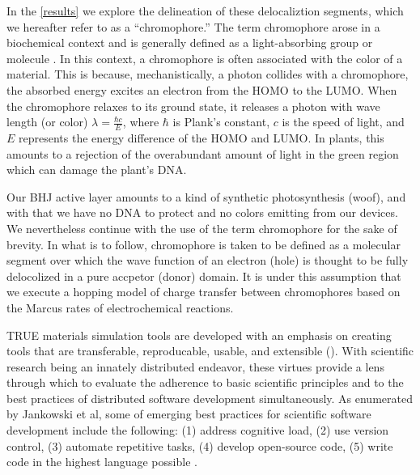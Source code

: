 In the \autoref{results} we explore the delineation of these delocaliztion segments, which we hereafter refer to as a
``chromophore.'' 
The term chromophore arose in a biochemical context and is generally defined
as a light-absorbing group or molecule \cite{biochemistry}.
In this context, a chromophore is often associated with the color of a material.
This is because, mechanistically, a photon collides with a chromophore, the absorbed energy
excites an electron from the HOMO to the
LUMO. When the chromophore relaxes to its
ground state, it releases a photon with wave length (or color) $\lambda = \frac{\hbar c}{E}$,
where $\hbar$ is Plank's constant, $c$ is the speed of light, and $E$ represents the
energy difference of the HOMO and LUMO. In plants, this amounts to a rejection of the overabundant amount of
light in the green region which can damage the plant's DNA. 

Our BHJ active layer amounts to a kind of synthetic photosynthesis (woof), and with that we have no DNA to
protect and no colors emitting from our devices. We nevertheless continue with the use of the term chromophore
for the sake of brevity. In what is to follow, chromophore is taken to be defined as a molecular segment over which the 
wave function of an electron (hole) is thought to be fully delocolized in a pure accpetor (donor) domain. 
It is under this assumption that we execute a hopping model of charge transfer between
chromophores based on the Marcus rates of electrochemical reactions.  

TRUE materials simulation tools are developed with an emphasis on creating tools that are
transferable, reproducable, usable, and extensible (\cite{Cummings2017}).
With scientific research being an innately distributed endeavor, these virtues provide a lens through which to
evaluate the adherence to basic scientific principles and to the best practices of distributed software development
simultaneously. As enumerated by Jankowski et al, some of emerging best practices for scientific software
development include the following: (1) address cognitive load, (2) use version control, (3) automate
repetitive tasks, (4) develop open-source code, (5) write code in the highest language possible
\cite{Jankowski2020}.



